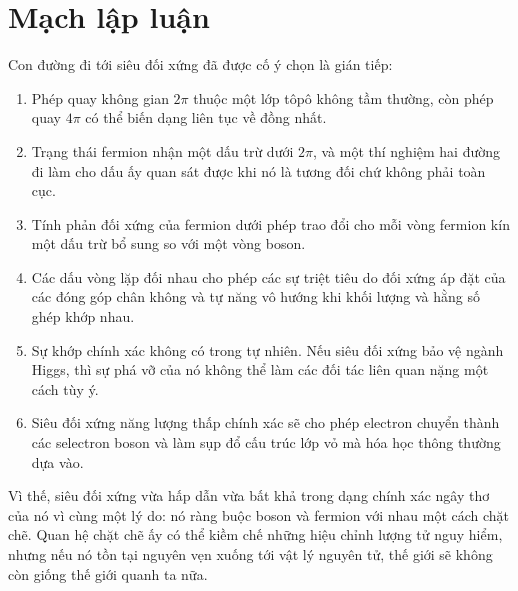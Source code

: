 \section{Mạch lập luận}

Con đường đi tới siêu đối xứng đã được cố ý chọn là gián tiếp:
\begin{enumerate}
\item Phép quay không gian \(2\pi\) thuộc một lớp tôpô không tầm thường, còn phép quay \(4\pi\) có thể biến dạng liên tục về đồng nhất.
\item Trạng thái fermion nhận một dấu trừ dưới \(2\pi\), và một thí nghiệm hai đường đi làm cho dấu ấy quan sát được khi nó là tương đối chứ không phải toàn cục.
\item Tính phản đối xứng của fermion dưới phép trao đổi cho mỗi vòng fermion kín một dấu trừ bổ sung so với một vòng boson.
\item Các dấu vòng lặp đối nhau cho phép các sự triệt tiêu do đối xứng áp đặt của các đóng góp chân không và tự năng vô hướng khi khối lượng và hằng số ghép khớp nhau.
\item Sự khớp chính xác không có trong tự nhiên. Nếu siêu đối xứng bảo vệ ngành Higgs, thì sự phá vỡ của nó không thể làm các đối tác liên quan nặng một cách tùy ý.
\item Siêu đối xứng năng lượng thấp chính xác sẽ cho phép electron chuyển thành các selectron boson và làm sụp đổ cấu trúc lớp vỏ mà hóa học thông thường dựa vào.
\end{enumerate}

Vì thế, siêu đối xứng vừa hấp dẫn vừa bất khả trong dạng chính xác ngây thơ của nó vì cùng một lý do: nó ràng buộc boson và fermion với nhau một cách chặt chẽ. Quan hệ chặt chẽ ấy có thể kiềm chế những hiệu chỉnh lượng tử nguy hiểm, nhưng nếu nó tồn tại nguyên vẹn xuống tới vật lý nguyên tử, thế giới sẽ không còn giống thế giới quanh ta nữa.
